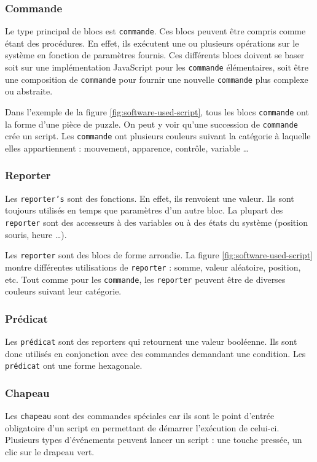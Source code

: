 \subsubsection{Commande}
Le type principal de \glspl{bloc} est \texttt{commande}. Ces \glspl{bloc} peuvent être compris comme étant des procédures. En effet, ils exécutent une ou plusieurs opérations sur le système en fonction de paramètres fournis. Ces différents \glspl{bloc} doivent se baser soit sur une implémentation JavaScript pour les \texttt{commande} élémentaires, soit être une composition de \texttt{commande} pour fournir une nouvelle \texttt{commande} plus complexe ou abstraite.

Dans l'exemple de la figure \ref{fig:software-used-script}, tous les \glspl{bloc} \texttt{commande} ont la forme d'une pièce de puzzle. On peut y voir qu'une succession de \texttt{commande} crée un \gls{script}. Les \texttt{commande} ont plusieurs couleurs suivant la catégorie à laquelle elles appartiennent : mouvement, apparence, contrôle, variable \ldots

\subsubsection{Reporter}
Les \texttt{reporter's} sont des fonctions. En effet, ils renvoient une valeur. Ils sont toujours utilisés en temps que paramètres d'un autre \gls{bloc}. La plupart des \texttt{reporter} sont des accesseurs à des variables ou à des états du système (position souris, heure \ldots).

Les \texttt{reporter} sont des \glspl{bloc} de forme arrondie. La figure \ref{fig:software-used-script} montre différentes utilisations de \texttt{reporter} : somme, valeur aléatoire, position, etc. Tout comme pour les \texttt{commande}, les \texttt{reporter} peuvent être de diverses couleurs suivant leur catégorie.

\subsubsection{Prédicat}
Les \texttt{prédicat} sont des reporters qui retournent une valeur booléenne. Ils sont donc utilisés en conjonction avec des commandes demandant une condition. Les \texttt{prédicat} ont une forme hexagonale.

\subsubsection{Chapeau}
Les \texttt{chapeau} sont des commandes spéciales car ils sont le point d'entrée obligatoire d'un \gls{script} en permettant de démarrer l'exécution de celui-ci. Plusieurs types d'événements peuvent lancer un \gls{script} : une touche pressée, un clic sur le drapeau vert.

